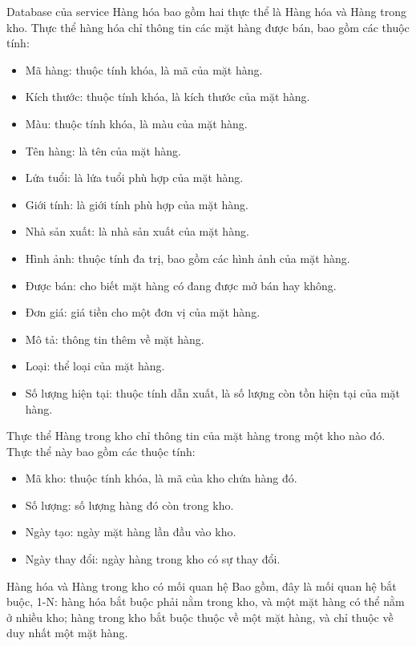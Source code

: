 \par Database của service Hàng hóa bao gồm hai thực thể là Hàng hóa và Hàng trong kho. Thực thể hàng hóa chỉ thông tin các mặt hàng được bán, bao gồm các thuộc tính:
\begin{itemize}
    \item Mã hàng: thuộc tính khóa, là mã của mặt hàng.
    \item Kích thước: thuộc tính khóa, là kích thước của mặt hàng.
    \item Màu: thuộc tính khóa, là màu của mặt hàng.
    \item Tên hàng: là tên của mặt hàng.
    \item Lứa tuổi: là lứa tuổi phù hợp của mặt hàng.
    \item Giới tính: là giới tính phù hợp của mặt hàng.
    \item Nhà sản xuất: là nhà sản xuất của mặt hàng.
    \item Hình ảnh: thuộc tính đa trị, bao gồm các hình ảnh của mặt hàng.
    \item Được bán: cho biết mặt hàng có đang được mở bán hay không.
    \item Đơn giá: giá tiền cho một đơn vị của mặt hàng.
    \item Mô tả: thông tin thêm về mặt hàng.
    \item Loại: thể loại của mặt hàng.
    \item Số lượng hiện tại: thuộc tính dẫn xuất, là số lượng còn tồn hiện tại của mặt hàng.
\end{itemize}

\par Thực thể Hàng trong kho chỉ thông tin của mặt hàng trong một kho nào đó. Thực thể này bao gồm các thuộc tính:
\begin{itemize}
    \item Mã kho: thuộc tính khóa, là mã của kho chứa hàng đó.
    \item Số lượng: số lượng hàng đó còn trong kho.
    \item Ngày tạo: ngày mặt hàng lần đầu vào kho.
    \item Ngày thay đổi: ngày hàng trong kho có sự thay đổi.
\end{itemize}

\par Hàng hóa và Hàng trong kho có mối quan hệ Bao gồm, đây là mối quan hệ bắt buộc, 1-N: hàng hóa bắt buộc phải nằm trong kho, và một mặt hàng có thể nằm ở nhiều kho; hàng trong kho bắt buộc thuộc về một mặt hàng, và chỉ thuộc về duy nhất một mặt hàng.

